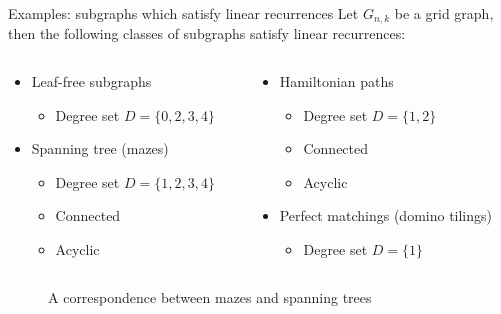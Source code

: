 \documentclass{beamer}%
\begin{document}
\begin{frame}{Examples: subgraphs which satisfy linear recurrences}
  Let $G_{n,k}$ be a grid graph, then the following classes of
  subgraphs satisfy linear recurrences:
  \begin{columns}
    \begin{column}{0.55\textwidth}
      \begin{itemize}
        \item Leaf-free subgraphs \begin{itemize}
          \item Degree set $D = \{0, 2, 3, 4\}$
        \end{itemize}
        \item Spanning tree (mazes) \begin{itemize}
          \item Degree set $D = \{1,2,3,4\}$
          \item Connected
          \item Acyclic
        \end{itemize}
      \end{itemize}
    \end{column}
    \begin{column}{0.45\textwidth}
      \begin{itemize}
        \item Hamiltonian paths \begin{itemize}
          \item Degree set $D = \{1, 2\}$
          \item Connected
          \item Acyclic
        \end{itemize}
        \item Perfect matchings (domino tilings) \begin{itemize}
          \item Degree set $D = \{1\}$
        \end{itemize}
      \end{itemize}
    \end{column}
  \end{columns}
  \begin{figure}[ht!]
    
    \caption{A correspondence between mazes and spanning trees}
  \end{figure}
\end{frame}
\end{document}
